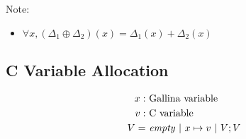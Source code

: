 \documentclass[a4paper,fleqn]{article}
\def\gallina{\textrm{Gallina}}
\begin{document}
{\small Note:
\begin{itemize}
  \item $\forall x, (\Delta_1 \oplus \Delta_2)(x) = \Delta_1(x) + \Delta_2(x)$ 
\end{itemize}}

\subsection{C Variable Allocation}\label{sec:cvaralloc}

\begin{align*}
  x :&\ \mbox{\gallina{} variable} \\
  v :&\ \mbox{C variable} \\
  V =&\ \mathit{empty} ~|~ x \mapsto v ~|~ V;V
\end{align*}
\end{document}
